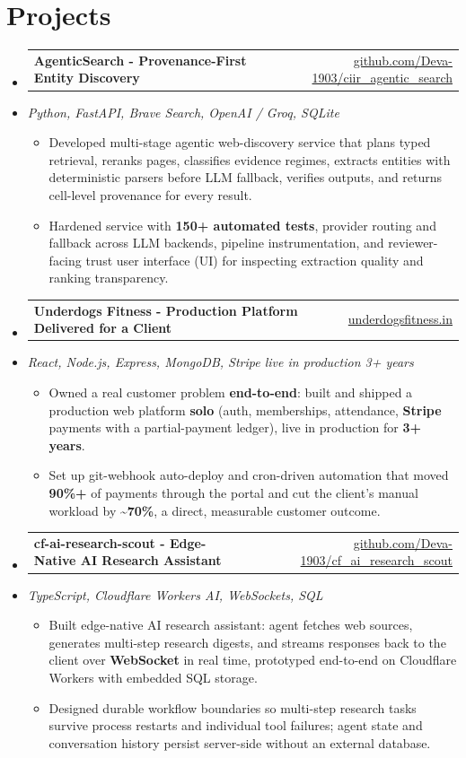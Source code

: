 \documentclass[letterpaper,10pt]{article}
\makeatletter
\newcommand{\resumeItem}[1]{
  \item\small{#1\vspace{-1pt}}
}
\newcommand{\resumeProjectHeading}[2]{
    \item
    \begin{tabular*}{0.985\textwidth}[t]{l@{\extracolsep{\fill}}r}
      \small\textbf{#1} & \small #2 \\
    \end{tabular*}\vspace{-5pt}
}
\newcommand{\resumeProjectSubheading}[1]{
  \vspace{-2pt}\item[] {\small\textcolor{ResumeSlate}{\emph{#1}}}\vspace{-3pt}
}
\newcommand{\resumeSubHeadingListStart}{\begin{itemize}[leftmargin=0.0in, label={}, itemsep=2pt, topsep=2pt]}
\newcommand{\resumeSubHeadingListEnd}{\end{itemize}}
\newcommand{\resumeItemListStart}{\begin{itemize}[leftmargin=0.18in, itemsep=2pt, topsep=1pt]}
\newcommand{\resumeItemListEnd}{\end{itemize}\vspace{-4pt}}
\makeatother
\begin{document}
\section{Projects}
\resumeSubHeadingListStart
  \resumeProjectHeading
    {AgenticSearch - Provenance-First Entity Discovery}
    {\href{https://github.com/Deva-1903/ciir_agentic_search}{github.com/Deva-1903/ciir\_agentic\_search}}
  \resumeProjectSubheading{Python, FastAPI, Brave Search, OpenAI / Groq, SQLite}
    \resumeItemListStart
      \resumeItem{Developed multi-stage agentic web-discovery service that plans typed retrieval, reranks pages, classifies evidence regimes, extracts entities with deterministic parsers before LLM fallback, verifies outputs, and returns cell-level provenance for every result.}
      \resumeItem{Hardened service with \textbf{150+ automated tests}, provider routing and fallback across LLM backends, pipeline instrumentation, and reviewer-facing trust user interface (UI) for inspecting extraction quality and ranking transparency.}
    \resumeItemListEnd
  \resumeProjectHeading
    {Underdogs Fitness - Production Platform Delivered for a Client}
    {\href{https://www.underdogsfitness.in}{underdogsfitness.in}}
  \resumeProjectSubheading{React, Node.js, Express, MongoDB, Stripe \enspace\textbar\enspace live in production 3+ years}
    \resumeItemListStart
      \resumeItem{Owned a real customer problem \textbf{end-to-end}: built and shipped a production web platform \textbf{solo} (auth, memberships, attendance, \textbf{Stripe} payments with a partial-payment ledger), live in production for \textbf{3+ years}.}
      \resumeItem{Set up git-webhook auto-deploy and cron-driven automation that moved \textbf{90\%+} of payments through the portal and cut the client's manual workload by \textbf{\textasciitilde70\%}, a direct, measurable customer outcome.}
    \resumeItemListEnd
  \resumeProjectHeading
    {cf-ai-research-scout - Edge-Native AI Research Assistant}
    {\href{https://github.com/Deva-1903/cf_ai_research_scout}{github.com/Deva-1903/cf\_ai\_research\_scout}}
  \resumeProjectSubheading{TypeScript, Cloudflare Workers AI, WebSockets, SQL}
    \resumeItemListStart
      \resumeItem{Built edge-native AI research assistant: agent fetches web sources, generates multi-step research digests, and streams responses back to the client over \textbf{WebSocket} in real time, prototyped end-to-end on Cloudflare Workers with embedded SQL storage.}
      \resumeItem{Designed durable workflow boundaries so multi-step research tasks survive process restarts and individual tool failures; agent state and conversation history persist server-side without an external database.}
    \resumeItemListEnd
\resumeSubHeadingListEnd
\vspace{-4pt}
\end{document}

